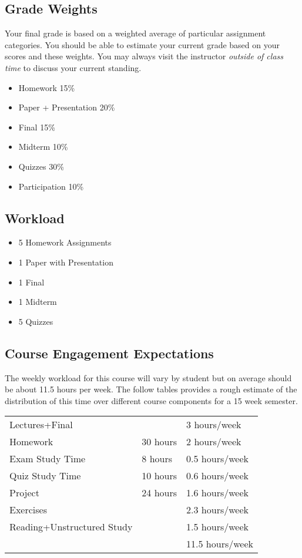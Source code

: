 \documentclass[10pt]{article}
\begin{document}
\subsection{Grade Weights}
Your final grade is based on a weighted average of particular assignment categories.  You should be able to estimate your current grade based on your scores and these weights.  You may always visit the instructor \textit{outside of class time} to discuss your current standing.  
\begin{itemize}
\item Homework 15\%
\item Paper + Presentation 20\%
\item Final 15\%
\item Midterm 10\%
\item Quizzes 30\%
\item Participation 10\%
\end{itemize} 

\subsection{Workload}

\begin{itemize}
\item 5 Homework Assignments
\item 1 Paper with Presentation
\item 1 Final
\item 1 Midterm
\item 5 Quizzes
\end{itemize}

\subsection{Course Engagement Expectations}

The weekly workload for this course will vary by student but on average should be about 11.5 hours per week.  The follow tables provides a rough estimate of the distribution of this time over different course components for a 15 week semester. 
\begin{center}
\begin{tabular}{|l|l|l|}
\hline
Lectures+Final &           & 3 hours/week \\ 
Homework & 30 hours        & 2 hours/week \\
Exam Study Time & 8 hours  & 0.5 hours/week \\ 
Quiz Study Time & 10 hours & 0.6 hours/week \\
Project & 24 hours         & 1.6 hours/week \\
Exercises &                & 2.3 hours/week \\
Reading+Unstructured Study & & 1.5 hours/week \\
\hline
& & 11.5 hours/week \\ 
\hline
\end{tabular}
\end{center}
\end{document}
